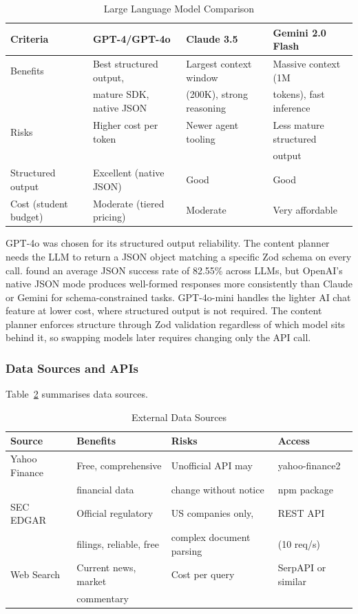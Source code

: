 \begin{table}[H]
\centering
\begin{tabular}{|l|l|l|l|}
\hline
\rowcolor{gray!20} \textbf{Criteria} & \textbf{GPT-4/GPT-4o} & \textbf{Claude 3.5} & \textbf{Gemini 2.0 Flash} \\
\hline
Benefits & Best structured output, & Largest context window & Massive context (1M \\
 & mature SDK, native JSON & (200K), strong reasoning & tokens), fast inference \\
\hline
Risks & Higher cost per token & Newer agent tooling & Less mature structured \\
 & & & output \\
\hline
Structured output & Excellent (native JSON) & Good & Good \\
\hline
Cost (student budget) & Moderate (tiered pricing) & Moderate & Very affordable \\
\hline
\end{tabular}
\caption{Large Language Model Comparison}
\label{tab:llm-comparison}
\end{table}

GPT-4o was chosen for its structured output reliability. The content planner needs the LLM to return a JSON object matching a specific Zod schema on every call. \textcite{shorten2024} found an average JSON success rate of 82.55\% across LLMs, but OpenAI's native JSON mode produces well-formed responses more consistently than Claude or Gemini for schema-constrained tasks. GPT-4o-mini handles the lighter AI chat feature at lower cost, where structured output is not required. The content planner enforces structure through Zod validation regardless of which model sits behind it, so swapping models later requires changing only the API call.

\subsubsection{Data Sources and APIs}

Table~\ref{tab:data-sources} summarises data sources.

\begin{table}[H]
\centering
\begin{tabular}{|l|l|l|l|}
\hline
\rowcolor{gray!20} \textbf{Source} & \textbf{Benefits} & \textbf{Risks} & \textbf{Access} \\
\hline
Yahoo Finance & Free, comprehensive & Unofficial API may & yahoo-finance2 \\
 & financial data & change without notice & npm package \\
\hline
SEC EDGAR & Official regulatory & US companies only, & REST API \\
 & filings, reliable, free & complex document parsing & (10 req/s) \\
\hline
Web Search & Current news, market & Cost per query & SerpAPI or similar \\
 & commentary & & \\
\hline
\end{tabular}
\caption{External Data Sources}
\label{tab:data-sources}
\end{table}

